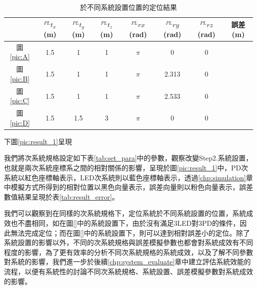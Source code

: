 \begin{table}[htpb]
    \begin{center}
      \caption{於不同系統設置位置的定位結果}
      \label{tab:pos_error_result}
      \begin{tabular}{c||c|c|c|c|c|c||c} %
         & $^{PL}t_x$(m) & $^{PL}t_y$(m)&$^{PL}t_z$(m)&$ ^{PL}rx$(rad) & $^{PL}ry$(rad)&$^{PL}rz$(rad)&誤差(m)\\
        \hline
        圖\ref{pic:A}& 1.5 & 1&1&$\pi$ & 0&0&\\
        圖\ref{pic:B}& 1.5 & 1&1&$\pi$ & 2.313&0\\
        圖\ref{pic:C}& 1.5 & 1&1&$\pi$ & 2.533&0\\
        圖\ref{pic:D}& 1.5 & 1.5&3&$\pi$ & 0&0\\
      \end{tabular}
    \end{center}
  \end{table}

  
下圖\ref{pic:result_1}呈現

我們將次系統規格設定如下表\ref{tab:set_para}中的參數，觀察改變Step2.系統設置，也就是兩次系統座標系之間的相對關係的影響，呈現於圖\ref{pic:result_1}中，PD次系統以紅色座標軸表示，LED次系統則以藍色座標軸表示，透過\ref{chp:simulation}章中模擬方式所得到的相對位置以黑色向量表示，誤差向量則以粉色向量表示，誤差數值結果呈現於表\ref{tab:result_error}。




我們可以觀察到在同樣的次系統規格下，定位系統於不同系統設置的位置，系統成效也不盡相同，如在圖\ref{}中的系統設置下，由於沒有滿足3LED對3PD的條件，因此無法完成定位；而在圖\ref{}中的系統設置下，則可以達到相對誤差小的定位。除了系統設置的影響以外，不同的次系統規格與誤差模擬參數也都會對系統成效有不同程度的影響，為了更有效率的分析不同次系統規格的系統成效，以及了解不同參數對系統的影響，我們進一步於後續\ref{chp:system_evaluate}章中建立評估系統效能的流程，以便有系統性的討論不同次系統規格、系統設置、誤差模擬參數對系統成效的影響。







